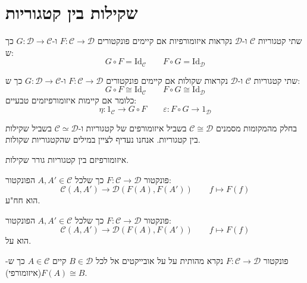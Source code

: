 \documentclass{tstextbook}
\begin{document}
\section{שקילות בין קטגוריות}

\begin{reminder}
שתי קטגוריות \(\mathcal{C}\) ו-\(\mathcal{D}\) נקראות איזומורפיות אם קיימים פונקטורים \(F:\mathcal{C}\to \mathcal{D}\) ו-\(G:\mathcal{D}\to \mathcal{C}\) כך ש:
$$G\circ  F=\mathrm{Id}_{\mathcal{C} }\qquad F\circ  G = \mathrm{Id}_{\mathcal{D} }$$

\end{reminder}
\begin{definition}
שתי קטגוריות \(\mathcal{C}\) ו-\(\mathcal{D}\) נקראות שקולות אם קיימים פונקטורים \(F:\mathcal{C}\to \mathcal{D}\) ו-\(G:\mathcal{D}\to \mathcal{C}\) כך ש:
$$G\circ  F\cong \mathrm{Id}_{\mathcal{C} }\qquad F\circ  G \cong  \mathrm{Id}_{\mathcal{D} }$$
כלומר אם קיימות איזומורפיזמים טבעיים:
$$\eta:1_{\mathcal{C} }\to G\circ  F\qquad \varepsilon:F\circ  G\to 1_{\mathcal{D} }$$

\end{definition}
\begin{symbolize}
בחלק מהמקומות מסמנים \(\mathcal{C}\cong \mathcal{D}\) בשביל איזומורפים של קטגוריות ו-\(\mathcal{C}\simeq \mathcal{D}\) בשביל שקילות בין קטגוריות. אנחנו נעדיף לציין במילים שהקטגוריות שקולות.

\end{symbolize}
\begin{corollary}
איזומורפיזם בין קטגוריות גורר שקילות.

\end{corollary}
\begin{definition}
פונקטור \(F:\mathcal{C}\to \mathcal{D}\) כך שלכל \(A,A' \in \mathcal{C}\) הפונקטור:
$$\mathcal{C} (A,A')\to \mathcal{D} (F(A),F(A'))\qquad f\mapsto F(f)$$
הוא חח"ע.

\end{definition}
\begin{definition}
פונקטור \(F:\mathcal{C}\to \mathcal{D}\) כך שלכל \(A,A' \in \mathcal{C}\) הפונקטור:
$$\mathcal{C} (A,A')\to \mathcal{D} (F(A),F(A'))\qquad f\mapsto F(f)$$
הוא על.

\end{definition}
\begin{definition}
פונקטור \(F:\mathcal{C}\to \mathcal{D}\) נקרא מהותית על על אובייקטים אל לכל \(B \in \mathcal{D}\) קיים \(A \in \mathcal{C}\) כך ש-\(F(A)\cong B\)(איזומורפי).

\end{definition}
\end{document}
